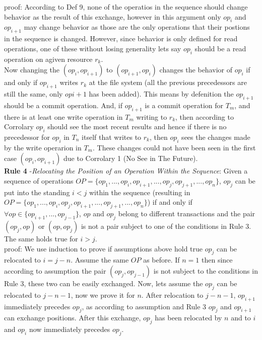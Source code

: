 \documentclass[a4paper, 11pt]{article}
\begin{document}
proof: According to Def 9, none of the operatios in the sequence should change behavior as the result of this exchange, however in this argument only $op_i$ and $op_{i+1}$ may change behavior as those are the only operations that their postions in the sequence is changed. However, since behavior is only defined for read operations, one of these without losing generality lets say $op_i$ should be a read operation on agiven resource $r_k$.\\

Now changing the $(op_i, op_{i+1})$ to $(op_{i+1}, op_i)$ changes the behavior of $op_i$ if and only if $op_{i+1}$ writes $r_k$ at the file system (all the previous precedessors are still the same, only $op{i+1}$ has been added). This means by defenition the $op_{i+1}$ should be a commit operation. And, if $op_{i+1}$ is a commit operation for $T_m$, and there is at least one write operation in $T_m$ writing to $r_k$, then according to Corrolary $op_i$ should see the most recent results and hence if there is no precedessor for $op_i$ in $T_n$ itself that writes to $r_k$, then $op_i$ sees the changes made by the write operarion in $T_m$. These changes could not have been seen in the first case $(op_i, op_{i+1})$ due to Corrolary 1 (No See in The Future).\\ 


\textbf{Rule 4} -\emph{Relocating the Position of an Operation Within the Sequence}: Given a sequence of operations $OP = \{op_1, ..., op_i, op_{i+1}, ..., op_j, op_{j+1}, ..., op_n\}$, $op_j$ can be put into the standing $i<j$ within the sequence (resulting in $OP = \{op_1, ..., op_i,op_j,op_{i+1},..., op_{j+1},...,op_n\}$) if and only if $\forall op \in \{op_{i+1}, ..., op_{j-1}\}$, $op$ and $op_j$ belong to different transactions and the pair $(op_j, op)$ or $(op,op_j)$ is not a pair subject to one of the conditions in Rule 3. The same holds true for $i>j$.\\

proof: We use induction to prove if assumptions above hold true $op_j$ can be relocated to $i = j-n$. Assume the same $OP$ as before. If $n = 1$ then since according to assumption the pair $(op_j, op_{j-1})$ is not subject to the conditions in Rule 3, these two can be easily exchanged. Now, lets assume the $op_j$ can be relocated to $j-n-1$, now we prove it for $n$.  After relocation to $j-n-1$, $op_{i+1}$ immediately precedes $op_j$, as according to assumption and Rule 3 $op_j$ and $op_{i+1}$ can exchange positions. After this exchange, $op_j$ has been relocated by $n$ and to $i$ and $op_i$ now immediately precedes $op_j$.\\
\end{document}
